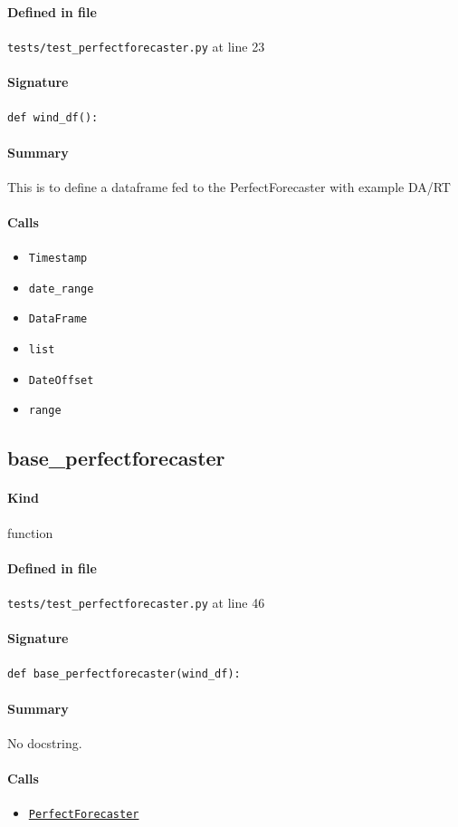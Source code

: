 \documentclass[11pt]{report}
\begin{document}
\paragraph{Defined in file} \texttt{tests/test\_perfectforecaster.py} at line 23
\paragraph{Signature} \texttt{def wind\_df():}
\paragraph{Summary} This is to define a dataframe fed to the PerfectForecaster with example DA/RT
\paragraph{Calls}
\begin{itemize}[leftmargin=*]
  \item \texttt{Timestamp}
  \item \texttt{date\_range}
  \item \texttt{DataFrame}
  \item \texttt{list}
  \item \texttt{DateOffset}
  \item \texttt{range}
\end{itemize}
\subsection{base\_perfectforecaster}
\label{def:tests-test_perfectforecaster.py:base_perfectforecaster:L46}
\paragraph{Kind} function
\paragraph{Defined in file} \texttt{tests/test\_perfectforecaster.py} at line 46
\paragraph{Signature} \texttt{def base\_perfectforecaster(wind\_df):}
\paragraph{Summary} No docstring.
\paragraph{Calls}
\begin{itemize}[leftmargin=*]
  \item \hyperref[def:forecaster.py:PerfectForecaster:L686]{\texttt{PerfectForecaster}}
\end{itemize}
\end{document}
